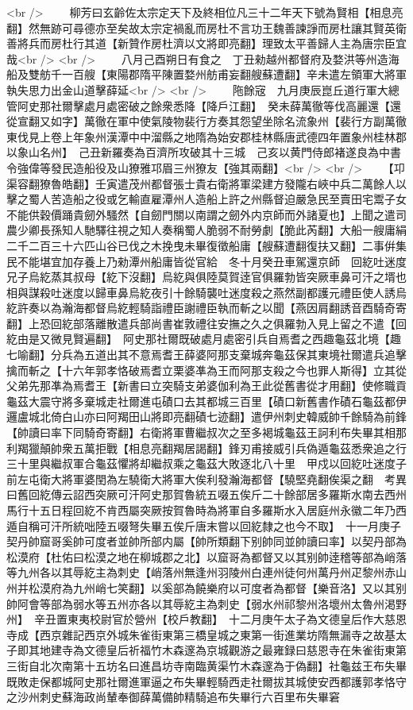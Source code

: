 <br />
　　柳芳曰玄齡佐太宗定天下及終相位凡三十二年天下號為賢相【相息亮翻】然無跡可尋德亦至矣故太宗定禍亂而房杜不言功王魏善諫諍而房杜讓其賢英衛善將兵而房杜行其道【新贊作房杜濟以文將即亮翻】理致太平善歸人主為唐宗臣宜哉<br />
<br />
　　八月己酉朔日有食之　丁丑勑越州都督府及婺洪等州造海船及雙舫千一百艘【東陽郡隋平陳置婺州舫甫妄翻艘蘇遭翻】辛未遣左領軍大將軍執失思力出金山道擊薛延<br />
<br />
　　陁餘宼　九月庚辰崑丘道行軍大總管阿史那社爾擊處月處密破之餘衆悉降【降戶江翻】　癸未薛萬徹等伐高麗還【還從宣翻又如字】萬徹在軍中使氣陵物裴行方奏其怨望坐除名流象州【裴行方副萬徹東伐見上卷上年象州漢潭中中溜縣之地隋為始安郡桂林縣唐武德四年置象州桂林郡以象山名州】　己丑新羅奏為百濟所攻破其十三城　己亥以黄門侍郎褚遂良為中書令強偉等發民造船役及山獠雅邛眉三州獠友【強其兩翻】<br />
<br />
　　【卭渠容翻獠魯皓翻】壬寅遣茂州都督張士貴右衛將軍梁建方發隴右峽中兵二萬餘人以擊之蜀人苦造船之役或乞輸直雇潭州人造船上許之州縣督迫嚴急民至賣田宅鬻子女不能供穀價踊貴劒外騷然【自劒門關以南謂之劒外内京師而外諸夏也】上聞之遣司農少卿長孫知人馳驛往視之知人奏稱蜀人脆弱不耐勞劇【脆此芮翻】大船一艘庸絹二千二百三十六匹山谷已伐之木挽曳未畢復徵船庸【艘蘇遭翻復扶又翻】二事倂集民不能堪宜加存養上乃勑潭州船庸皆從官給　冬十月癸丑車駕還京師　回紇吐迷度兄子烏紇蒸其叔母【紇下沒翻】烏紇與俱陸莫賀逹官俱羅勃皆突厥車鼻可汗之壻也相與謀殺吐迷度以歸車鼻烏紇夜引十餘騎襲吐迷度殺之燕然副都護元禮臣使人誘烏紇許奏以為瀚海都督烏紇輕騎詣禮臣謝禮臣執而斬之以聞【燕因肩翻誘音酉騎奇寄翻】上恐回紇部落離散遣兵部尚書崔敦禮往安撫之久之俱羅勃入見上留之不遣【回紇由是又微見賢遍翻】　阿史那社爾既破處月處密引兵自焉耆之西趣龜茲北境【趣七喻翻】分兵為五道出其不意焉耆王薛婆阿那支棄城奔龜茲保其東境社爾遣兵追擊擒而斬之【十六年郭孝恪破焉耆立栗婆凖為王而阿那支殺之今也罪人斯得】立其從父弟先那凖為焉耆王【新書曰立突騎支弟婆伽利為王此從舊書從才用翻】使修職貢龜茲大震守將多棄城走社爾進屯磧口去其都城三百里【磧口新舊書作磧石龜茲都伊邏盧城北倚白山亦曰阿羯田山將即亮翻磧七迹翻】遣伊州刺史韓威帥千餘騎為前鋒【帥讀曰率下同騎奇寄翻】右衛將軍曹繼叔次之至多褐城龜茲王訶利布失畢其相那利羯獵顛帥衆五萬拒戰【相息亮翻羯居謁翻】鋒刃甫接威引兵偽遁龜茲悉衆追之行三十里與繼叔軍合龜茲懼將却繼叔乘之龜茲大敗逐北八十里　甲戍以回紇吐迷度子前左屯衛大將軍婆閏為左驍衛大將軍大俟利發瀚海都督【驍堅堯翻俟渠之翻　考異曰舊回紇傳云詔西突厥可汗阿史那賀魯統五啜五俟斤二十餘部居多羅斯水南去西州馬行十五日程回紇不肯西屬突厥按賀魯時為將軍自多羅斯水入居庭州永徽二年乃西遁自稱可汗所統咄陸五啜弩失畢五俟斤唐末嘗以回紇隸之也今不取】　十一月庚子契丹帥窟哥奚帥可度者並帥所部内屬【帥所類翻下别帥同並帥讀曰率】以契丹部為松漠府【杜佑曰松漠之地在柳城郡之北】以窟哥為都督又以其别帥逹稽等部為峭落等九州各以其辱紇主為刺史【峭落州無逢州羽陵州白連州徒何州萬丹州疋黎州赤山州并松漠府為九州峭七笑翻】以奚部為饒樂府以可度者為都督【樂音洛】又以其别帥阿會等部為弱水等五州亦各以其辱紇主為刺史【弱水州祁黎州洛壞州太魯州渇野州】　辛丑置東夷校尉官於營州【校戶教翻】　十二月庚午太子為文德皇后作大慈恩寺成【西京雜記西京外城朱雀街東第三橋皇城之東第一街進業坊隋無漏寺之故基太子即其地建寺為文德皇后祈福竹木森邃為京城觀游之最雍録曰慈恩寺在朱雀街東第三街自北次南第十五坊名曰進昌坊寺南臨黄渠竹木森邃為于偽翻】社龜兹王布失畢既敗走保都城阿史那社爾進軍逼之布失畢輕騎西走社爾拔其城使安西都護郭孝恪守之沙州刺史蘇海政尚輦奉御薛萬備帥精騎追布失畢行六百里布失畢窘